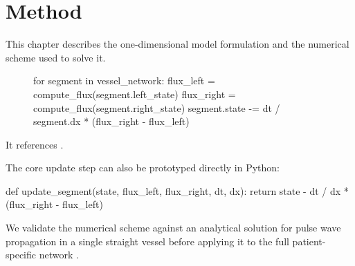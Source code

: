 \chapter{Method}

This chapter describes the one-dimensional model formulation and the
numerical scheme used to solve it.

\begin{figure}
  \begin{algorithm}[caption={One time step of the explicit finite-volume update.}, label=alg:1]
    for segment in vessel_network:
        flux_left = compute_flux(segment.left_state)
        flux_right = compute_flux(segment.right_state)
        segment.state -= dt / segment.dx * (flux_right - flux_left)
  \end{algorithm}
\end{figure}

It references .

The core update step can also be prototyped directly in Python:

\begin{python}
def update_segment(state, flux_left, flux_right, dt, dx):
    return state - dt / dx * (flux_right - flux_left)
\end{python}

We validate the numerical scheme against an analytical solution for
pulse wave propagation in a single straight vessel before applying it to
the full patient-specific network \citep{Diem2017a,Diem2017b}.
